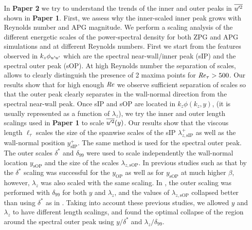 In \textbf{Paper 2} we try to understand the trends of the inner and outer peaks in $\overline{u^{\prime}\mkern-1.2mu ^2}$ shown in \textbf{Paper 1}. First, we assess why the inner-scaled inner peak grows with Reynolds number and APG magnitude. 
We perform a scaling analysis of the different energetic scales of the power-spectral density for both ZPG and APG simulations and at different Reynolds numbers.
First we start from the features observed in $k_z\phi_{u^{\prime}\mkern-1.2mu u^{\prime}\mkern-1.2mu}$ which are the spectral near-wall/inner peak (sIP) and the spectral outer peak (sOP). 
At high Reynolds number the separation of scales, allows to clearly distinguish the presence of 2 maxima points for $\mbox{\textit{Re}}_{\tau}>500$. 
Our results show that for high enough $\mbox{\textit{Re}}$ we observe sufficient separation of scales so that the outer peak clearly separates in the wall-normal direction from the spectral near-wall peak.
Once sIP and sOP are located in $k_z\phi(k_z, y)$, (it is usually represented as a function of $\lambda_z$), we try the inner and outer length scalings used in \textbf{Paper 1} to scale $\overline{u^{\prime}\mkern-1.2mu ^2}(y)$.
Our results show that the viscous length $\ell_{\tau}$ scales the size of the spanwise scales of the sIP $\lambda_{z, \mathrm{sIP}}^+$ as well as the wall-normal position $y^+_{\mathrm{sIP}}$.
The same method is used for the spectral outer peak. The outer scales $\delta^*$ and $\delta_{99}$ were used to scale independently the wall-normal location $y_{\mathrm{sOP}}$ and the size of the scales $\lambda_{z, \mathrm{sOP}}$.
In previous studies such as that by \cite{Kitsios2017} the $\delta^*$ scaling was successful for the $y_{\mathrm{OP}}$ as well as for $y_{\mathrm{sOP}}$ at much higher $\beta$, however, $\lambda_z$ was also scaled with the same scaling.
In \cite{tanarro_2020}, the outer scaling was performed with $\delta_{99}$ for both $y$ and $\lambda_z$, and the values of $\lambda_{z,\mathrm{sOP}}$ collapsed better than using $\delta^*$ as in \cite{Kitsios2017}.
Taking into account these previous studies, we allowed $y$ and $\lambda_z$ to have different length scalings, and found the optimal collapse of the region around the spectral outer peak using $y/\delta^*$ and $\lambda_z/\delta_{99}$.

